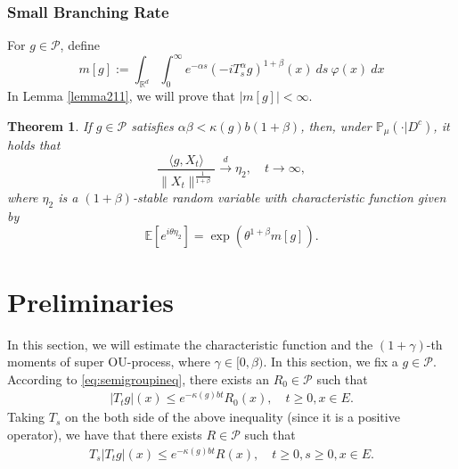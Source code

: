 \documentclass[12pt, a4paper]{amsart}
\newtheorem{thm}{Theorem}[section]
\theoremstyle{definition}
\numberwithin{equation}{section}
\begin{document}
\subsubsection{Small Branching Rate}

For $g\in \mathcal{P}$, define
$$m[g]:=\int_{\mathbb{R}^d}\int_0^{\infty} e^{-\alpha s}(-iT_{s}^{\alpha}g)^{1+\beta}(x)~ds~\varphi(x)~dx$$
In Lemma \ref{lemma211}, we will prove that $|m[g]|<\infty$.
\begin{thm}\label{Theorem13}
    If $g\in\mathcal{P}$ satisfies  $\alpha\beta<\kappa(g)b(1+\beta)$, then, under $\mathbb{P}_{\mu}(\cdot|D^c)$, it holds that
    $$\frac{\langle g,X_t\rangle}{\|X_t\|^{\frac{1}{1+\beta}}}\xrightarrow{d} \eta_2, \quad t\rightarrow \infty,$$
    where $\eta_2$ is a $(1+\beta)$-stable random variable with characteristic function given by
    $$\mathbb{E} [e^{i\theta \eta_2}]=\exp(\theta^{1+\beta}m[g]).$$
\end{thm}

\section{Preliminaries}
In this section, we will estimate the characteristic function and the $(1+\gamma)$-th moments of super OU-process, where $\gamma \in [0,\beta)$. 
    In this section, we fix a $g\in \mathcal{P}$. 
    According to \eqref{eq:semigroupineq}, there exists an $R_0\in\mathcal{P}$ such that 
\begin{align}
     |T_tg|(x)
     \leq e^{-\kappa(g)bt}R_0(x),
     \quad t\geq 0,x\in E.
\end{align}
Taking $T_s$ on the both side of the above inequality (since it is a positive operator), we have that there exists $R \in \mathcal P$ such that
\begin{align}
\label{eq:gcontrol}
    T_s|T_t g|(x) 
    \leq e^{-\kappa(g)bt} R(x), 
    \quad t\geq 0,s\geq 0,x\in E.
\end{align}
\end{document}
